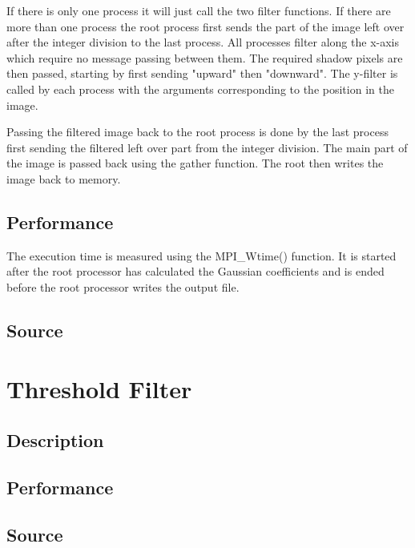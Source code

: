 \documentclass[a4paper, 12pt]{article}
\begin{document}
If there is only one process it will just call the two filter functions. If
there are more than one process the root process first sends the part of the
image left over after the integer division to the last process. All processes
filter along the x-axis which require no message passing between them.
The required shadow pixels are then passed, starting by first sending "upward"
then "downward". The y-filter is called by each process with the arguments 
corresponding to the position in the image. 

Passing the filtered image back to the root process is done by the last process 
first sending the filtered left over part from the integer division. The main
part of the image is passed back using the gather function.
The root then writes the image back to memory.
 

\subsection{Performance}
The execution time is measured using the MPI\_Wtime() function. It is started
after the root processor has calculated the Gaussian
coefficients and is ended before the root processor writes the output file.

\subsection{Source}

\section{Threshold Filter}
\subsection{Description}
\subsection{Performance}
\subsection{Source}
\end{document}
